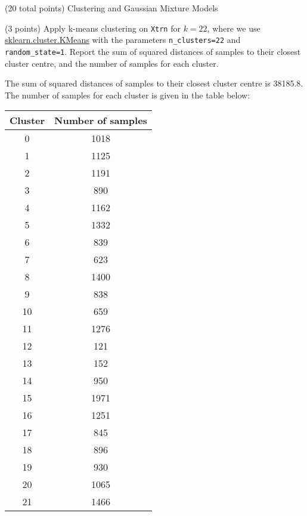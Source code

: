 \documentclass[12pt]{article}
\begin{document}
\begin{question}{(20 total points) Clustering and Gaussian Mixture Models}  


  


  \medskip
   \begin{subquestion}{(3 points)
       Apply k-means clustering on {\tt Xtrn} for $k = 22$, where we use
       \href{https://scikit-learn.org/0.19/modules/generated/sklearn.cluster.KMeans.html}{sklearn.cluster.KMeans}
       with the parameters {\tt n\_clusters=22} and {\tt random\_state=1}.
       Report the sum of squared distances of samples to their closest
       cluster centre, and the number of samples for each cluster.
     } \label{Q3.1}
   

      \begin{answerbox}{35em}
         The sum of squared distances of samples to their closest cluster centre is 38185.8.
         The number of samples for each cluster is given in the table below:
         \begin{center}
	\begin{tabular}{|c|c|}
		\hline
		Cluster & Number of samples \\  \hline
		0 & 1018 \\
		1 & 1125 \\
		2 & 1191 \\
		3 & 890 \\
		4 & 1162 \\
		5 & 1332 \\
		6 & 839 \\
		7 & 623 \\
		8 & 1400 \\
		9 & 838 \\
		10 & 659 \\
		11 & 1276 \\
		12 & 121 \\
		13 & 152 \\
		14 & 950 \\
		15 & 1971 \\
		16 & 1251 \\
		17 & 845 \\
		18 & 896 \\
		19 & 930 \\
		20 & 1065 \\
		21 & 1466 \\
		\hline
	\end{tabular}
	\end{center}
      \end{answerbox}
  



\end{subquestion}
\end{question}
\end{document}
